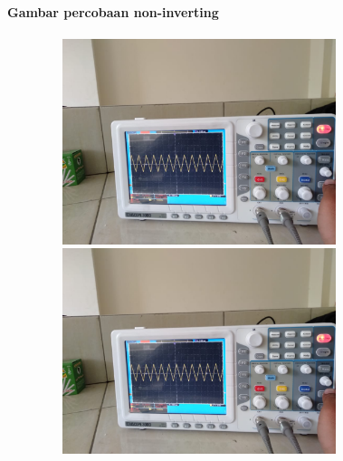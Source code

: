 \documentclass[12pt,a4paper]{article}
\begin{document}
\newpage
\begin{figure}
\paragraph{Gambar percobaan non-inverting}
\paragraph{ }
\begin{center}

\includegraphics[width=12cm, height=6cm]{Integrator4.png}

\includegraphics[width=12cm, height=6cm]{Integrator5.png}

\end{center}
\end{figure}
\vspace{2cm}
\end{document}
